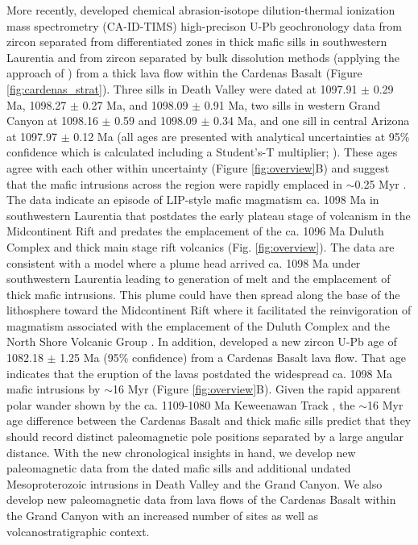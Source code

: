 \documentclass[draft]{agujournal2019}
\begin{document}
More recently,  developed chemical abrasion-isotope dilution-thermal ionization mass spectrometry (CA-ID-TIMS) high-precison U-Pb geochronology data from zircon separated from differentiated zones in thick mafic sills in southwestern Laurentia and from zircon separated by bulk dissolution methods (applying the approach of ) from a thick lava flow within the Cardenas Basalt (Figure \ref{fig:cardenas_strat}). Three sills in Death Valley were dated at 1097.91 $\pm$ 0.29 Ma, 1098.27 $\pm$ 0.27 Ma, and 1098.09 $\pm$ 0.91 Ma, two sills in western Grand Canyon at 1098.16 $\pm$ 0.59 and 1098.09 $\pm$ 0.34 Ma, and one sill in central Arizona at 1097.97 $\pm$ 0.12 Ma (all ages are presented with analytical uncertainties at 95\% confidence which is calculated including a Student’s-T multiplier; ). These ages agree with each other within uncertainty (Figure \ref{fig:overview}B) and suggest that the mafic intrusions across the region were rapidly emplaced in $\sim$0.25 Myr \cite{Mohr2024a}. The data indicate an episode of LIP-style mafic magmatism ca. 1098 Ma in southwestern Laurentia that postdates the early plateau stage of volcanism in the Midcontinent Rift and predates the emplacement of the ca. 1096 Ma Duluth Complex and thick main stage rift volcanics (Fig. \ref{fig:overview}). The data are consistent with a model where a plume head arrived ca. 1098 Ma under southwestern Laurentia leading to generation of melt and the emplacement of thick mafic intrusions. This plume could have then spread along the base of the lithosphere toward the Midcontinent Rift where it facilitated the reinvigoration of magmatism associated with the emplacement of the Duluth Complex and the North Shore Volcanic Group \cite{Mohr2024a}. In addition,  developed a new zircon U-Pb age of 1082.18 $\pm$ 1.25 Ma (95\% confidence) from a Cardenas Basalt lava flow. That age indicates that the eruption of the lavas postdated the widespread ca. 1098 Ma mafic intrusions by $\sim$16 Myr (Figure \ref{fig:overview}B). Given the rapid apparent polar wander shown by the ca. 1109-1080 Ma Keweenawan Track \cite{Swanson-Hysell2019a}, the $\sim$16 Myr age difference between the Cardenas Basalt and thick mafic sills predict that they should record distinct paleomagnetic pole positions separated by a large angular distance. With the new chronological insights in hand, we develop new paleomagnetic data from the dated mafic sills and additional undated Mesoproterozoic intrusions in Death Valley and the Grand Canyon. We also develop new paleomagnetic data from lava flows of the Cardenas Basalt within the Grand Canyon with an increased number of sites as well as volcanostratigraphic context. 
\end{document}
